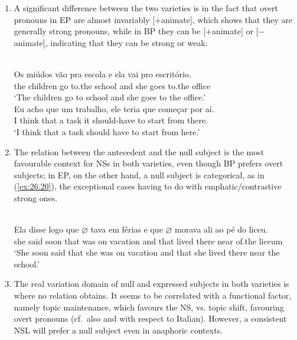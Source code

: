 \documentclass[output=paper]{langsci/langscibook}
\begin{document}
\begin{enumerate}[label=(\alph*)]
\item A significant difference between the two varieties is in the
fact that overt pronouns in \gls{EP} are almost
invariably [+animate], which shows that they are generally strong pronouns,
while in \gls{BP} they can be [+animate] or
[$-$animate], indicating that they can be strong or weak.

\ea\label{ex:26.19}
    \ea{}\\
	\gll	Os miúdos  vão pra     escola e     ela vai    pro      escritório.\\
			the children go    to.the school and she goes to.the   office\\
	\glt	\enquote*{The children go to      school and she goes to the office.}
    \ex{}\\
	\gll	Eu acho que um trabalho, ele teria  que começar por aí.\\
			I think   that a   task           it should-have to start       from there.\\
	\glt	\enquote*{I think that  a task should have to start from here.}
    \z
\z

\item The  relation between the antecedent and the null
subject is the most favourable context for NSs in both varieties, even though
\gls{BP} prefers overt subjects; in
\gls{EP}, on the other hand, a null subject is
categorical, as in (\ref{ex:26.20}), the exceptional cases having to do with
emphatic/contrastive strong ones.\largerpage[-1]

\ea%
    \label{ex:26.20}\\
	\gll	Ela disse logo que \textbf{$\varnothing$} tava em
    férias e que \textbf{$\varnothing$} morava ali {ao pé} do liceu.\\
            she said soon that {} was on vacation  and  that {} lived there
            near of.the liceum\\
	\glt	\enquote*{She soon said that she was on vacation and that she lived there near the school.}
\z

\item The real variation domain of null and expressed subjects in
both varieties is where no  relation obtains. It seems to be correlated
with a functional factor, namely topic maintenance, which favours the NS, vs.
topic shift, favouring overt pronouns (cf.\ also \citealt{DeOliveira2000} and
\citealt{Marins2009} with respect to Italian). However, a consistent NSL will
prefer a null subject even in anaphoric contexts.


\end{enumerate}
\end{document}
